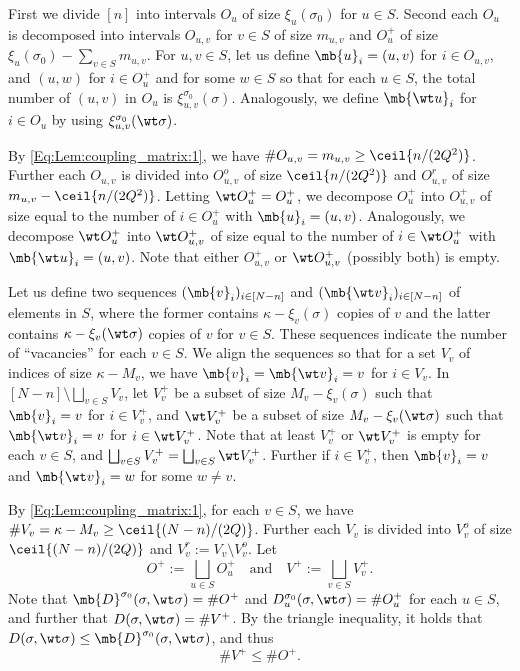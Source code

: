 \documentclass[12pt, reqno]{amsart}
\begin{document}
First we divide $[n]$ into intervals $O_u$ of size $\xi_u(\sigma_0)$ for $u \in S$.
Second each $O_u$ is decomposed into intervals $O_{u,v}$ for $v \in S$ of size $m_{u,v}$
and $O_u^+$ of size $\xi_u(\sigma_0)-\sum_{v \in S}m_{u,v}$.
For $u, v \in S$,
let us define $\mb{u}_i=(u, v)$ for $i \in O_{u,v}$,
and $(u, w)$ for $i \in O_u^+$ and for some $w \in S$
so that for each $u \in S$,
the total number of $(u, v)$ in $O_u$ is $\xi_{u,v}^{\sigma_0}(\sigma)$.
Analogously, we define $\mb{\wt u}_i$ for $i \in O_u$ by using $\xi^{\sigma_0}_{u, v}(\wt \sigma)$.

By \eqref{Eq:Lem:coupling_matrix:1}, we have $\#O_{u, v}=m_{u, v} \ge \ceil{n/(2Q^2)}$.
Further each $O_{u,v}$ is divided into $O_{u,v}^o$ of size $\ceil{n/(2Q^2)}$ and $O_{u,v}^r$ of size $m_{u,v}-\ceil{n/(2Q^2)}$.
Letting $\wt O_u^+=O_u^+$,
we decompose $O_u^+$ into $O_{u, v}^+$ of size equal to the number of $i \in O_u^+$
with $\mb{u}_i=(u, v)$.
Analogously,
we decompose $\wt O_u^+$ into $\wt O_{u,v}^+$ of size equal to the number of $i \in \wt O_u^+$ with $\mb{\wt u}_i=(u, v)$.
Note that either $O_{u,v}^+$ or $\wt O_{u,v}^+$ (possibly both) is empty.

Let us define two sequences $(\mb{v}_i)_{i \in [N-n]}$ and $(\mb{\wt v}_i)_{i \in [N-n]}$ of elements in $S$,
where the former contains $\kappa-\xi_v(\sigma)$ copies of $v$ and the latter contains $\kappa-\xi_v(\wt \sigma)$ copies of $v$ for $v \in S$.
These sequences indicate the number of ``vacancies'' for each $v \in S$.
We align the sequences so that for a set $V_v$ of indices of size $\kappa-M_v$,
we have $\mb{v}_i=\mb{\wt v}_i=v$ for $i \in V_v$.
In $[N-n]\setminus \bigsqcup_{v \in S}V_v$,
let $V_v^+$ be a subset of size $M_v-\xi_v(\sigma)$ such that $\mb{v}_i=v$ for $i \in V_v^+$,
and $\wt V_v^+$ be a subset of size $M_v-\xi_v(\wt \sigma)$ such that $\mb{\wt v}_i=v$ for $i \in \wt V_v^+$. 
Note that at least $V_v^+$ or $\wt V_v^+$ is empty for each $v \in S$,
and $\bigsqcup_{v \in S}V_v^+=\bigsqcup_{v \in S}\wt V_v^+$.
Further if $i \in V_v^+$,
then $\mb{v}_i=v$ and $\mb{\wt v}_i=w$ for some $w \neq v$.


By \eqref{Eq:Lem:coupling_matrix:1},
for each $v \in S$,
we have $\#V_v=\kappa-M_v \ge \ceil{(N-n)/(2Q)}$.
Further each $V_v$ is divided into $V_v^o$ of size $\ceil{(N-n)/(2Q)}$ and $V_v^r:=V_v\setminus V_v^o$.
Let
\[
O^+:=\bigsqcup_{u \in S}O_u^+ \quad \text{and} \quad V^+:=\bigsqcup_{v \in S}V_v^+.
\]
Note that $\mb{D}^{\sigma_0}(\sigma, \wt \sigma)=\#O^+$ and $D^{\sigma_0}_u(\sigma, \wt \sigma)=\#O_u^+$ for each $u\in S$,
and further that $D(\sigma, \wt \sigma)=\#V^+$.
By the triangle inequality, 
it holds that $D(\sigma, \wt \sigma)\le \mb{D}^{\sigma_0}(\sigma, \wt \sigma)$,
and thus 
\begin{equation}\label{Eq:V+O+}
\#V^+\le \#O^+.
\end{equation}
\end{document}
